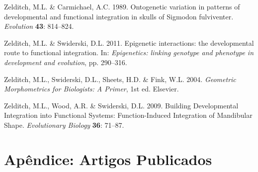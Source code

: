 \documentclass[12pt,twoside]{report}
\begin{document}
Zelditch, M.L. \& Carmichael, A.C. 1989. Ontogenetic variation in
patterns of developmental and functional integration in skulls of
Sigmodon fulviventer. \emph{Evolution} \textbf{43}: 814--824.

Zelditch, M.L. \& Swiderski, D.L. 2011. Epigenetic interactions: the
developmental route to functional integration. In: \emph{Epigenetics:
linking genotype and phenotype in development and evolution}, pp.
290--316.

Zelditch, M.L., Swiderski, D.L., Sheets, H.D. \& Fink, W.L. 2004.
\emph{Geometric Morphometrics for Biologists: A Primer}, 1st ed.
Elsevier.

Zelditch, M.L., Wood, A.R. \& Swiderski, D.L. 2009. Building
Developmental Integration into Functional Systems: Function-Induced
Integration of Mandibular Shape. \emph{Evolutionary Biology}
\textbf{36}: 71--87.

\chapter*{Apêndice: Artigos Publicados}






\end{document}
